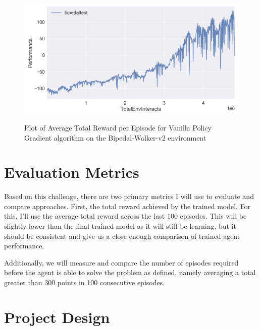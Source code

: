 \documentclass{article}
\begin{document}
\begin{figure}[ht]
\caption{Plot of Average Total Reward per Episode for Vanilla Policy Gradient algorithm on the Bipedal-Walker-v2 environment}
\centering
\includegraphics[scale=0.25]{images/bipedal-vpg-performance-plot.png}
\label{fig:benchmark_results}
\end{figure}

\section{Evaluation Metrics}
\label{sec:metrics}
Based on this challenge, there are two primary metrics I will use to evaluate and compare approaches. First, the total reward achieved by the trained model. For this, I'll use the average total reward across the last 100 episodes. This will be slightly lower than the final trained model as it will still be learning, but it should be consistent and give us a close enough comparison of trained agent performance. 

Additionally, we will measure and compare the number of episodes required before the agent is able to solve the problem as defined, namely averaging a total greater than 300 points in 100 consecutive episodes.

\section{Project Design}
\label{sec:design}
\end{document}
